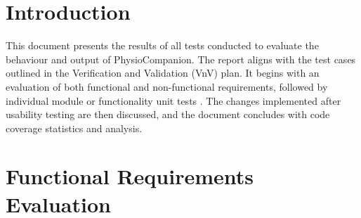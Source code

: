 \documentclass[12pt, titlepage]{article}
\begin{document}
\newpage


\section{Introduction}
This document presents the results of all tests conducted to evaluate the behaviour and output of 
PhysioCompanion. The report aligns with the test cases outlined in the Verification and Validation (VnV) plan. 
It begins with an evaluation of both functional and non-functional requirements, followed by individual module or
functionality unit tests . The changes implemented after usability testing are then discussed, and the document 
concludes with code coverage statistics and analysis.


\section{Functional Requirements Evaluation}
\end{document}
